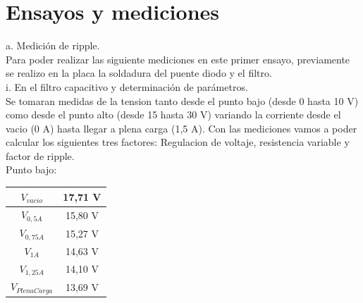 \chapter{Ensayos y mediciones}

a. Medición de ripple.\\

  Para poder realizar las siguiente mediciones en este primer ensayo, previamente se realizo en la placa la soldadura del puente diodo y el filtro.\\

i. En el filtro capacitivo y determinación de parámetros.\\

  Se tomaran medidas de la tension tanto desde el punto bajo (desde 0 hasta 10 V) como desde el punto alto (desde 15 hasta 30 V) variando la corriente desde el vacio (0 A) hasta llegar a plena carga (1,5 A). Con las mediciones vamos a poder calcular los siguientes tres factores: Regulacion de voltaje, resistencia variable y factor de ripple.\\

Punto bajo:

\begin{tabular}{|c|c|}
  \hline
  $V_{vacio}$ & 17,71 V \\ \hline
  $V_{0,5 A}$ & 15,80 V \\ \hline
  $V_{0,75 A}$ & 15,27 V \\ \hline    
  $V_{1 A}$ & 14,63 V \\ \hline
  $V_{1,25 A}$ & 14,10 V \\ \hline
  $V_{PlenaCarga}$ & 13,69 V \\ \hline
\end{tabular} \\


\begin{figure}[H]
\end{figure}


